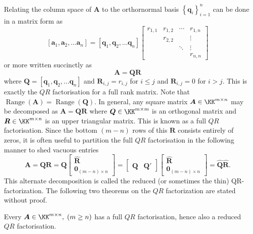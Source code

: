 Relating the column space of $\bm{A}$ to the orthornormal basis $\left\{ \bm{q}_{i} \right\}_{i=1}^{n}$ can be done in a matrix form as
\[
    \left[ \bm{a}_1 , \bm{a}_2 , \ldots \bm{a}_n \right] =
    \left[ \bm{q}_1 , \bm{q}_2 , \ldots \bm{q}_n \right]
    \begin{bmatrix}
        r_{1,1} & r_{1,2} & \cdots & r_{1,n} \\
                & r_{2,2} &        & \vdots  \\
                &         & \ddots & \vdots  \\
                &         &        & r_{n,n}
    \end{bmatrix}
\]
or more written succinctly as
\begin{equation}\label{eq: QR_factorisation}
    \bm{A} = \bm{Q} \bm{R}
\end{equation}
where $\bm{Q} = \left[ \bm{q}_1 , \bm{q}_2 , \ldots \bm{q}_n \right]$ and $\bm{R}_{i,j} = r_{i,j}$ for $i \leq j$ and $\bm{R}_{i,j} = 0$ for $i > j$. This is exactly the $QR$ factorisation for a full rank matrix. Note that $\operatorname{Range} \left( \bm{A} \right) = \operatorname{Range} \left( \bm{Q} \right)$. In general, any square matrix  $\bm{A} \in \KK^{m \times n}$ may be decomposed as $\bm{A} = \bm{Q} \bm{R}$ where $\bm{Q} \in \KK^{m \times m}$ is an orthogonal matrix and $\bm{R} \in \KK^{m \times n}$ is an upper triangular matrix. This is known as a full $QR$ factorisation. Since the bottom $(m-n)$ rows of this $\bm{R}$ consists entirely of zeros, it is often useful to partition the full $QR$ factorisation in the following manner to shed vacuous entries
\[
    \bm{A} = \bm{Q} \bm{R} = \bm{Q}
    \begin{bmatrix}
        \hat{\bm{R}} \\
        \bm{0}_{(m-n) \times n}
    \end{bmatrix}
    =
    \begin{bmatrix}
        \hat{\bm{Q}} & \bm{Q}'
    \end{bmatrix}
    \begin{bmatrix}
        \hat{\bm{R}} \\
        \bm{0}_{(m-n) \times n}
    \end{bmatrix}
    = \hat{\bm{Q}} \hat{\bm{R}}.
\]
This alternate decomposition is called the reduced (or sometimes the thin) QR-factorization. The following two theorems on the $QR$ factorization are stated without proof.

\begin{thm} \label{theorem: QR_general_existence}
    Every $\bm{A} \in \KK^{m \times n}, \; (m \geq n)$ has a full $QR$ factorisation, hence also a reduced $QR$ factorisation.
    \cite{TrefethenLloydN.LloydNicholas1997Nla/}
\end{thm}

